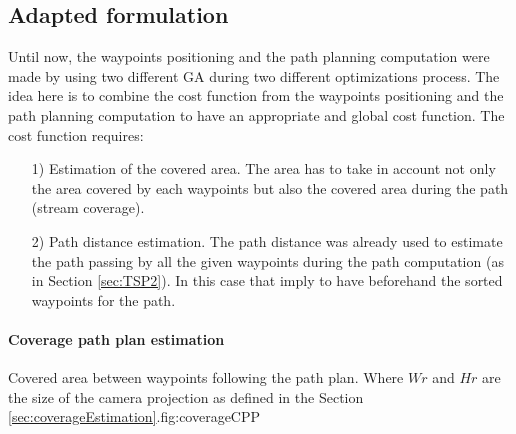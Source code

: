 		\subsection{Adapted formulation }
Until now, the waypoints positioning and the path planning computation were made by using two different GA during two different optimizations process. The idea here is to combine the cost function from the waypoints positioning and the path planning computation to have an appropriate and global cost function.
The cost function requires:
\begin{itemize}
	\item[1)] Estimation of the covered area. The area has to take in account not only the area covered by each waypoints but also the covered area during the path (stream coverage).%
	\item[2)] Path distance estimation. The path distance was already used to estimate the path passing  by all the given waypoints during the path computation (as in Section \ref{sec:TSP2}). In this case that imply to have beforehand the sorted waypoints for the path.
\end{itemize}

\paragraph*{Coverage path plan estimation}\label{par:CPPestimation}

  \begin{mfigures}[!]{Covered area between waypoints following the path plan. Where $Wr$ and $Hr$ are the size of the camera projection  as defined in the Section \ref{sec:coverageEstimation}.}{fig:coverageCPP} \centering

\end{mfigures}  



